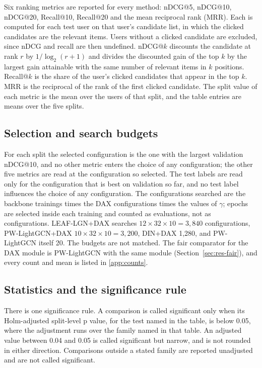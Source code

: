 \documentclass[preprint,12pt,authoryear]{elsarticle}
\begin{document}
Six ranking metrics are reported for every method: nDCG@5, nDCG@10, nDCG@20, Recall@10, Recall@20 and the mean reciprocal rank (MRR). Each is
computed for each test user on that user's candidate list, in which the clicked candidates are the relevant items. Users without a clicked
candidate are excluded, since nDCG and recall are then undefined. nDCG@$k$ discounts the candidate at rank $r$ by $1/\log_2(r+1)$ and divides the
discounted gain of the top $k$ by the largest gain attainable with the same number of relevant items in $k$ positions. Recall@$k$ is the share of
the user's clicked candidates that appear in the top $k$. MRR is the reciprocal of the rank of the first clicked candidate. The split value of each
metric is the mean over the users of that split, and the table entries are means over the five splits.

\subsection{Selection and search budgets}
\label{sec:protocol-selection}

For each split the selected configuration is the one with the largest validation nDCG@10, and no other metric enters the choice of any
configuration; the other five metrics are read at the configuration so selected. The test labels are read only for the configuration
that is best on validation so far, and no test label influences the choice of any configuration. The configurations searched are the backbone
trainings times the DAX configurations times the values of $\gamma$; epochs are selected inside each training and counted as evaluations, not
as configurations. LEAF-LGN+DAX searches $12\times32\times10=3{,}840$ configurations, PW-LightGCN+DAX $10\times32\times10=3{,}200$, DIN+DAX 1,280,
and PW-LightGCN itself 20. The budgets are not matched. The fair comparator for the DAX module is PW-LightGCN with the same module
(Section~\ref{sec:res-fair}), and every count and mean is listed in \ref{app:counts}.

\subsection{Statistics and the significance rule}
\label{sec:protocol-stats}

There is one significance rule. A comparison is called significant only when its Holm-adjusted split-level p value, for the test named in the
table, is below 0.05, where the adjustment runs over the family named in that table. An adjusted value between 0.04 and 0.05 is called
significant but narrow, and is not rounded in either direction. Comparisons outside a stated family are reported unadjusted and are not called
significant.
\end{document}

